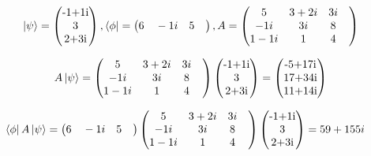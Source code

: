 \documentclass[10pt,a4paper]{article}
\begin{document}
\begin{align}
\ket{\psi} = \begin{pmatrix}
$-1+1i$\\
$3$\\
$2+3i$\\
\end{pmatrix}, \bra{\phi} = \begin{pmatrix}
6\quad-1i\quad5\quad\end{pmatrix}, A = \begin{pmatrix}
5&3+2i &3i &\\-1i &3i &8&\\1-1i &1&4&\\\end{pmatrix}\end{align}

\begin{align}
A\ket{\psi} = \begin{pmatrix}
5&3+2i &3i &\\-1i &3i &8&\\1-1i &1&4&\\\end{pmatrix}\begin{pmatrix}
$-1+1i$\\
$3$\\
$2+3i$\\
\end{pmatrix}=\begin{pmatrix}
$-5+17i$\\
$17+34i$\\
$11+14i$\\
\end{pmatrix}\end{align}

\begin{align}
\bra{\phi}A\ket{\psi}= \begin{pmatrix}
6\quad-1i\quad5\quad\end{pmatrix}\begin{pmatrix}
5&3+2i &3i &\\-1i &3i &8&\\1-1i &1&4&\\\end{pmatrix}\begin{pmatrix}
$-1+1i$\\
$3$\\
$2+3i$\\
\end{pmatrix}=59+155i &\end{align}
\end{document}
